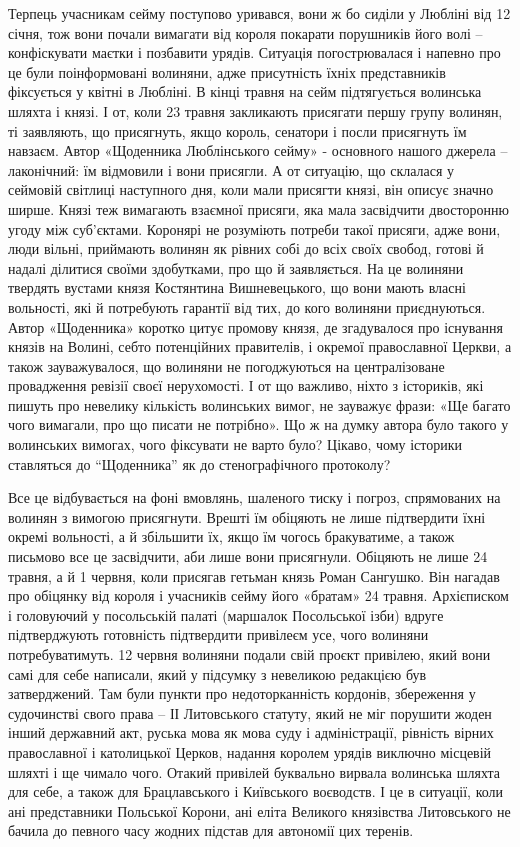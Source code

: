 Терпець учасникам сейму поступово уривався, вони ж бо сиділи у Любліні від 12
січня, тож вони почали вимагати від короля покарати порушників його волі –
конфіскувати маєтки і позбавити урядів. Ситуація погострювалася і напевно про
це були поінформовані волиняни, адже присутність їхніх представників фіксується
у квітні в Любліні. В кінці травня на сейм підтягується волинська шляхта і
князі. І от, коли 23 травня закликають присягати першу групу волинян, ті
заявляють, що присягнуть, якщо король, сенатори і посли присягнуть їм навзаєм.
Автор «Щоденника Люблінського сейму» - основного нашого джерела – лаконічний:
їм відмовили і вони присягли. А от ситуацію, що склалася у сеймовій світлиці
наступного дня, коли мали присягти князі, він описує значно ширше. Князі теж
вимагають взаємної присяги, яка мала засвідчити двосторонню угоду між
суб’єктами. Коронярі не розуміють потреби такої присяги, адже вони, люди
вільні, приймають волинян як рівних собі до всіх своїх свобод, готові й надалі
ділитися своїми здобутками, про що й заявляється. На це волиняни твердять
вустами князя Костянтина Вишневецького, що вони мають власні вольності, які й
потребують гарантії від тих, до кого волиняни приєднуються. Автор «Щоденника»
коротко цитує промову князя, де згадувалося про існування князів на Волині,
себто потенційних правителів, і окремої православної Церкви, а також
зауважувалося, що волиняни не погоджуються на централізоване провадження
ревізії своєї нерухомості. І от що важливо, ніхто з істориків, які пишуть про
невелику кількість волинських вимог, не зауважує фрази: «Ще багато чого
вимагали, про що писати не потрібно». Що ж на думку автора було такого у
волинських вимогах, чого фіксувати не варто було? Цікаво, чому історики
ставляться до “Щоденника” як до  стенографічного протоколу?  

Все це відбувається на фоні вмовлянь, шаленого тиску і погроз, спрямованих на
волинян з вимогою присягнути. Врешті їм обіцяють не лише підтвердити їхні
окремі вольності, а й збільшити їх, якщо їм чогось бракуватиме, а також
письмово все це засвідчити, аби лише вони присягнули. Обіцяють не лише 24
травня, а й 1 червня, коли присягав гетьман князь Роман Сангушко. Він нагадав
про обіцянку від короля і учасників сейму його «братам» 24 травня. Архієписком
і головуючий у посольській палаті (маршалок Посольської ізби) вдруге
підтверджують готовність підтвердити привілеєм усе, чого волиняни
потребуватимуть. 12 червня волиняни подали свій проєкт привілею, який вони самі
для себе написали, який у підсумку з невеликою редакцією був затверджений. Там
були пункти про недоторканність кордонів, збереження у судочинстві свого права
– ІІ Литовського статуту, який не міг порушити жоден інший державний акт,
руська мова як мова суду і адміністрації, рівність вірних православної і
католицької Церков, надання королем урядів виключно місцевій шляхті і ще чимало
чого. Отакий привілей буквально вирвала волинська шляхта для себе, а також для
Брацлавського і Київського воєводств. І це в ситуації, коли ані представники
Польської Корони, ані еліта Великого князівства Литовського не бачила до
певного часу жодних підстав для автономії цих теренів. 

